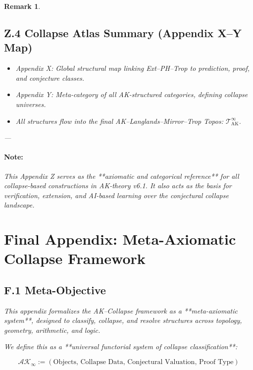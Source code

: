 \documentclass[11pt]{article}
\newtheorem{remark}[theorem]{Remark}
\begin{document}
\begin{remark}
\vspace{1em}

\subsection*{Z.4 Collapse Atlas Summary (Appendix X–Y Map)}

\begin{itemize}
  \item Appendix X: Global structural map linking Ext–PH–Trop to prediction, proof, and conjecture classes.
  \item Appendix Y: Meta-category of all AK-structured categories, defining \textit{collapse universes}.
  \item All structures flow into the final AK–Langlands–Mirror–Trop Topos: \( \mathscr{T}_{\mathrm{AK}}^\infty \).
\end{itemize}

---

\paragraph{Note:}
This Appendix Z serves as the **axiomatic and categorical reference** for all collapse-based constructions in AK-theory v6.1.  
It also acts as the basis for verification, extension, and AI-based learning over the conjectural collapse landscape.


\section*{Final Appendix: Meta-Axiomatic Collapse Framework}

\subsection*{F.1 Meta-Objective}

This appendix formalizes the AK–Collapse framework as a **meta-axiomatic system**,  
designed to classify, collapse, and resolve structures across topology, geometry, arithmetic, and logic.

We define this as a **universal functorial system of collapse classification**:

\[
\boxed{
\mathcal{AK}_\infty := \left( \text{Objects, Collapse Data, Conjectural Valuation, Proof Type} \right)
}
\]


\end{remark}
\end{document}
